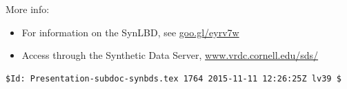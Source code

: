 \begin{frame}[fragile]
\begin{center}
More info: 
\begin{itemize}
\item For information on the SynLBD, see 
\href{http://www2.vrdc.cornell.edu/news/data/lbd-synthetic-data/}{goo.gl/eyrv7w}
\item Access through the Synthetic Data Server, 
\href{http://www.vrdc.cornell.edu/sds/}{www.vrdc.cornell.edu/sds/} 
\end{itemize}

\end{center}
\tiny\vspace{0.8\textheight}\vfill 
\begin{verbatim}
$Id: Presentation-subdoc-synbds.tex 1764 2015-11-11 12:26:25Z lv39 $
\end{verbatim}
\end{frame}

